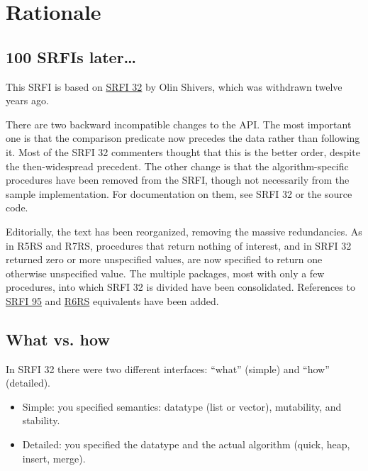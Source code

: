 \section{Rationale}\label{rationale}

\subsection{100 SRFIs later\ldots{}}\label{srfis-later}

This SRFI is based on
\href{http://srfi.schemers.org/srfi-32/srfi-32.txt}{SRFI 32} by Olin
Shivers, which was withdrawn twelve years ago.

There are two backward incompatible changes to the API. The most
important one is that the comparison predicate now precedes the data
rather than following it. Most of the SRFI 32 commenters thought that
this is the better order, despite the then-widespread precedent. The
other change is that the algorithm-specific procedures have been removed
from the SRFI, though not necessarily from the sample implementation.
For documentation on them, see SRFI 32 or the source code.

Editorially, the text has been reorganized, removing the massive
redundancies. As in R5RS and R7RS, procedures that return nothing of
interest, and in SRFI 32 returned zero or more unspecified values, are
now specified to return one otherwise unspecified value. The multiple
packages, most with only a few procedures, into which SRFI 32 is divided
have been consolidated. References to
\href{http://srfi.schemers.org/srfi-95/srfi-95.html}{SRFI 95} and
\href{http://www.r6rs.org/final/html/r6rs-lib/r6rs-lib-Z-H-5.html\#node_chap_4}{R6RS}
equivalents have been added.

\subsection{What vs. how}\label{Whatvs.how}

In SRFI 32 there were two different interfaces: ``what'' (simple) and
``how'' (detailed).

\begin{itemize}
\tightlist
\item
  Simple: you specified semantics: datatype (list or vector),
  mutability, and stability.
\end{itemize}

\begin{itemize}
\tightlist
\item
  Detailed: you specified the datatype and the actual algorithm (quick,
  heap, insert, merge).
\end{itemize}

